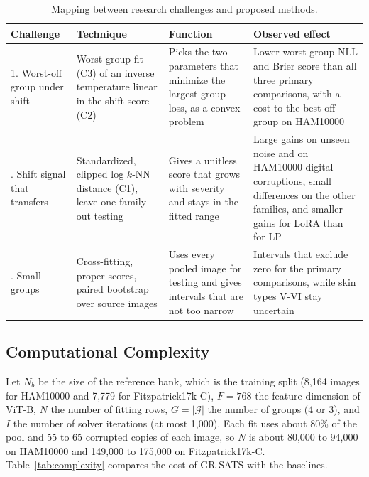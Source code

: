 \documentclass[sigconf,nonacm]{acmart}
\begin{document}
\begin{table}[t]
  \caption{Mapping between research challenges and proposed methods.}
  \label{tab:mapping}
  \scriptsize
  \setlength{\tabcolsep}{3pt}
  \renewcommand{\arraystretch}{1.1}
  \begin{tabularx}{\columnwidth}{@{}P{1.3cm}LLL@{}}
    \toprule
    \textbf{Challenge} & \textbf{Technique} & \textbf{Function} & \textbf{Observed effect} \\
    . Worst-off group under shift & Worst-group fit (C3) of an inverse temperature linear in the shift score (C2) & Picks the two parameters that minimize the largest group loss, as a convex problem & Lower worst-group NLL and Brier score than all three primary comparisons, with a cost to the best-off group on HAM10000 \\
    . Shift signal that transfers & Standardized, clipped log $k$-NN distance (C1), leave-one-family-out testing & Gives a unitless score that grows with severity and stays in the fitted range & Large gains on unseen noise and on HAM10000 digital corruptions, small differences on the other families, and smaller gains for LoRA than for LP \\
    . Small groups & Cross-fitting, proper scores, paired bootstrap over source images & Uses every pooled image for testing and gives intervals that are not too narrow & Intervals that exclude zero for the primary comparisons, while skin types V-VI stay uncertain \\
    \bottomrule
  \end{tabularx}
\end{table}

\subsection{Computational Complexity}
\label{sec:complexity}

Let $N_b$ be the size of the reference bank, which is the training split (8,164 images for HAM10000 and 7,779 for Fitzpatrick17k-C), $F = 768$ the feature dimension of ViT-B, $N$ the number of fitting rows, $G = |\mathcal{G}|$ the number of groups (4 or 3), and $I$ the number of solver iterations (at most 1,000). Each fit uses about 80\% of the pool and 55 to 65 corrupted copies of each image, so $N$ is about 80,000 to 94,000 on HAM10000 and 149,000 to 175,000 on Fitzpatrick17k-C. Table~\ref{tab:complexity} compares the cost of GR-SATS with the baselines.
\end{document}

